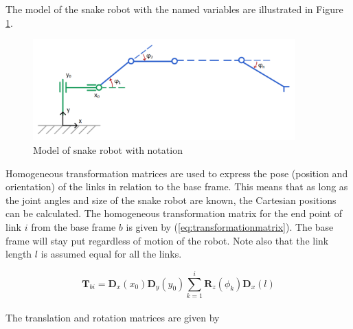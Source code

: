 The model of the snake robot with the named variables are illustrated in Figure \ref{fig:kin_name}. 
\begin{figure}
    \centering
    \includegraphics[width=0.9\textwidth]{figures/kinematics.PNG}
    \caption{Model of snake robot with notation}
    \label{fig:kin_name}
\end{figure}


Homogeneous transformation matrices are used to express the pose (position and orientation) of the links in relation to the base frame. This means that as long as the joint angles and size of the snake robot are known, the Cartesian positions can be calculated.
The homogeneous transformation matrix for the end point of link $i$ from the base frame $b$ is given by (\ref{eq:transformationmatrix}). The base frame will stay put regardless of motion of the robot. Note also that the link length $l$ is assumed equal for all the links.

\begin{equation} \label{eq:transformationmatrix}
    \textbf{T}_{b i} = \textbf{D}_x(x_0) \textbf{D}_y(y_0) \sum_{k=1}^{i} \textbf{R}_z(\phi_k) \textbf{D}_x(l)
\end{equation}
\\
The translation and rotation matrices are given by

